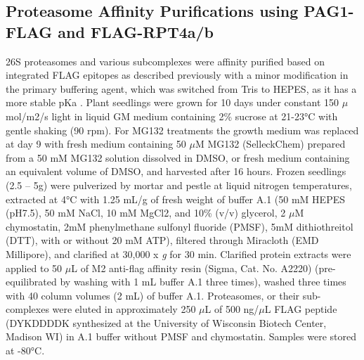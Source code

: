 \subsection{Proteasome Affinity Purifications using PAG1-FLAG and FLAG-RPT4a/b}
	26S proteasomes and various subcomplexes were affinity purified based on integrated FLAG epitopes as described previously with a minor modification in the primary buffering agent, which was switched from Tris to HEPES, as it has a more stable pKa \citep{book10, marshall17}. Plant seedlings were grown for 10 days under constant 150 $\mu$mol/m2/s light in liquid GM medium containing 2\% sucrose at 21-23°C with gentle shaking (90 rpm). For MG132 treatments the growth medium was replaced at day 9 with fresh medium containing 50 $\mu$M MG132 (SelleckChem) prepared from a 50 mM MG132 solution dissolved in DMSO, or fresh medium containing an equivalent volume of DMSO, and harvested after 16 hours. Frozen seedlings (2.5 – 5g) were pulverized by mortar and pestle at liquid nitrogen temperatures, extracted at 4°C with 1.25 mL/g of fresh weight of buffer A.1 (50 mM HEPES (pH7.5), 50 mM NaCl, 10 mM MgCl2, and 10\%  (v/v) glycerol, 2 $\mu$M chymostatin, 2mM phenylmethane sulfonyl fluoride (PMSF), 5mM dithiothreitol (DTT), with or without 20 mM ATP), filtered through Miracloth (EMD Millipore), and clarified at 30,000 x \textit{g} for 30 min. Clarified protein extracts were applied to 50 $\mu$L of M2 anti-flag affinity resin (Sigma, Cat. No. A2220) (pre-equilibrated by washing with 1 mL buffer A.1 three times), washed three times with 40 column volumes (2 mL) of buffer A.1. Proteasomes, or their sub-complexes were eluted in approximately 250 $\mu$L of 500 ng/$\mu$L FLAG peptide (DYKDDDDK synthesized at the University of Wisconsin Biotech Center, Madison WI) in A.1 buffer without PMSF and chymostatin. Samples were stored at -80°C.
